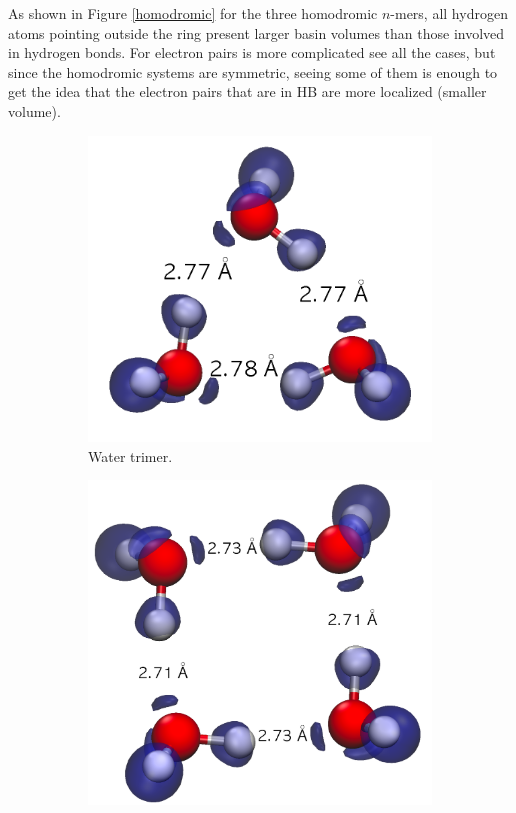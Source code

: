 As shown in Figure \ref{homodromic} for the three homodromic $n$-mers, all
hydrogen atoms pointing outside the ring present larger basin volumes than
those involved in hydrogen bonds. For electron pairs is more complicated see
all the cases, but since the homodromic systems are symmetric, seeing some of
them is enough to get the idea that the electron pairs that are in HB are more
localized (smaller volume).

\begin{figure}[h]
  \centering
  \begin{subfigure}[b]{0.32\linewidth}
    \includegraphics[width=\linewidth]{4/plots/elf/new/trimerELF}
    \caption{Water trimer.}
  \end{subfigure}
  \begin{subfigure}[b]{0.32\linewidth}
    \includegraphics[width=\linewidth]{4/plots/elf/new/tetramer}

\end{subfigure}
\end{figure}

